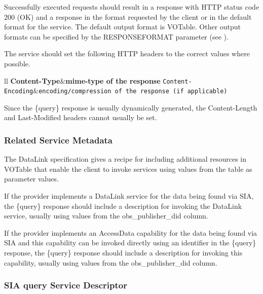 \documentclass[11pt,a4paper]{ivoa}
\begin{document}
Successfully executed requests should result in a response with HTTP status code 200 (OK) and a response in the format requested by the client or in the default format for the service. The default output format is VOTable. Other output formats can be specified by the RESPONSEFORMAT parameter (see \cite{std:DALI}).

The service should set the following HTTP headers to the correct values where possible.
\begin{table}[H]
\begin{tabular}{ll}
\sptablerule
\textbf{Content-Type}&\textbf{mime-type of the response}\cr
\sptablerule
\texttt{Content-Encoding}&\texttt{encoding/compression of the response (if applicable)}\cr
\sptablerule
\end{tabular}
\caption{Recommended HTTP Response Headers}
\label{tab:RespHead}
\end{table}





Since the \{query\} response is usually dynamically generated, the Content-Length and Last-Modified headers cannot usually be set.

\subsubsection{Related Service Metadata}
The DataLink specification  gives a recipe for including additional resources in VOTable that enable the client to invoke services using values from the table as parameter values. 

If the provider implements a DataLink service for the data being found via SIA, the \{query\} response should include a description for invoking the DataLink service, usually using values from the obs\_publisher\_did column.
 
If the provider implements an AccessData capability for the data being found via SIA and this capability can be invoked directly using an identifier in the \{query\} response, the \{query\} response should include a description for invoking this capability, usually using values from the obs\_publisher\_did column.



\subsubsection{SIA {query} Service Descriptor}
\end{document}
